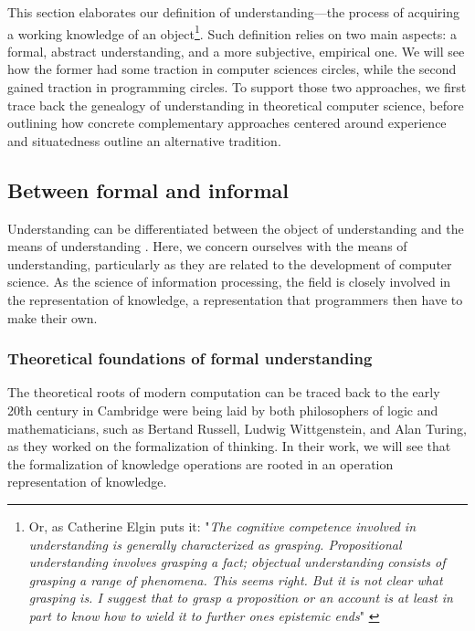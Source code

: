 This section elaborates our definition of understanding—the process of acquiring a working knowledge of an object\footnote{Or, as Catherine Elgin puts it: "\emph{The cognitive competence involved in understanding is generally characterized as grasping. Propositional understanding involves grasping a fact; objectual understanding consists of grasping a range of phenomena. This seems right. But it is not clear what grasping is. I suggest that to grasp a proposition or an account is at least in part to know how to wield it to further ones epistemic ends}" \citep{elgin_true_2017}}. Such definition relies on two main aspects: a formal, abstract understanding, and a more subjective, empirical one. We will see how the former had some traction in computer sciences circles, while the second gained traction in programming circles. To support those two approaches, we first trace back the genealogy of understanding in theoretical computer science, before outlining how concrete complementary approaches centered around experience and situatedness outline an alternative tradition.

\subsection{Between formal and informal}
\label{subsec:formal-informal}

Understanding can be differentiated between the object of understanding and the means of understanding \citep{elgin_true_2017}. Here, we concern ourselves with the means of understanding, particularly as they are related to the development of computer science. As the science of information processing, the field is closely involved in the representation of knowledge, a representation that programmers then have to make their own.

\subsubsection{Theoretical foundations of formal understanding}
\label{subsubsec:theoretical-understanding}

The theoretical roots of modern computation can be traced back to the early 20\^{th} century in Cambridge were being laid by both philosophers of logic and mathematicians, such as Bertand Russell, Ludwig Wittgenstein, and Alan Turing, as they worked on the formalization of thinking. In their work, we will see that the formalization of knowledge operations are rooted in an operation representation of knowledge.

